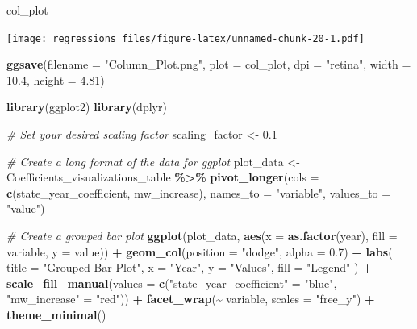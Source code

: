 \documentclass[
]{article}
\newenvironment{Shaded}{\begin{snugshade}}{\end{snugshade}}
\newcommand{\AttributeTok}[1]{\textcolor[rgb]{0.13,0.29,0.53}{#1}}
\newcommand{\CommentTok}[1]{\textcolor[rgb]{0.56,0.35,0.01}{\textit{#1}}}
\newcommand{\FloatTok}[1]{\textcolor[rgb]{0.00,0.00,0.81}{#1}}
\newcommand{\FunctionTok}[1]{\textcolor[rgb]{0.13,0.29,0.53}{\textbf{#1}}}
\newcommand{\NormalTok}[1]{#1}
\newcommand{\OtherTok}[1]{\textcolor[rgb]{0.56,0.35,0.01}{#1}}
\newcommand{\SpecialCharTok}[1]{\textcolor[rgb]{0.81,0.36,0.00}{\textbf{#1}}}
\newcommand{\StringTok}[1]{\textcolor[rgb]{0.31,0.60,0.02}{#1}}
\begin{document}
\begin{Shaded}
\begin{Highlighting}[]
\NormalTok{col\_plot}
\end{Highlighting}
\end{Shaded}

\texttt{[image: regressions\_files/figure-latex/unnamed-chunk-20-1.pdf]}

\begin{Shaded}
\begin{Highlighting}[]
\FunctionTok{ggsave}\NormalTok{(}\AttributeTok{filename =} \StringTok{"Column\_Plot.png"}\NormalTok{, }\AttributeTok{plot =}\NormalTok{ col\_plot, }\AttributeTok{dpi =} \StringTok{"retina"}\NormalTok{, }\AttributeTok{width =} \FloatTok{10.4}\NormalTok{, }\AttributeTok{height =} \FloatTok{4.81}\NormalTok{)}
\end{Highlighting}
\end{Shaded}

\begin{Shaded}
\begin{Highlighting}[]
\FunctionTok{library}\NormalTok{(ggplot2)}
\FunctionTok{library}\NormalTok{(dplyr)}

\CommentTok{\# Set your desired scaling factor}
\NormalTok{scaling\_factor }\OtherTok{\textless{}{-}} \FloatTok{0.1}

\CommentTok{\# Create a long format of the data for ggplot}
\NormalTok{plot\_data }\OtherTok{\textless{}{-}}\NormalTok{ Coefficients\_visualizations\_table }\SpecialCharTok{\%\textgreater{}\%}
  \FunctionTok{pivot\_longer}\NormalTok{(}\AttributeTok{cols =} \FunctionTok{c}\NormalTok{(state\_year\_coefficient, mw\_increase),}
               \AttributeTok{names\_to =} \StringTok{"variable"}\NormalTok{,}
               \AttributeTok{values\_to =} \StringTok{"value"}\NormalTok{)}

\CommentTok{\# Create a grouped bar plot}
\FunctionTok{ggplot}\NormalTok{(plot\_data, }\FunctionTok{aes}\NormalTok{(}\AttributeTok{x =} \FunctionTok{as.factor}\NormalTok{(year), }\AttributeTok{fill =}\NormalTok{ variable, }\AttributeTok{y =}\NormalTok{ value)) }\SpecialCharTok{+}
  \FunctionTok{geom\_col}\NormalTok{(}\AttributeTok{position =} \StringTok{"dodge"}\NormalTok{, }\AttributeTok{alpha =} \FloatTok{0.7}\NormalTok{) }\SpecialCharTok{+}
  \FunctionTok{labs}\NormalTok{(}
    \AttributeTok{title =} \StringTok{"Grouped Bar Plot"}\NormalTok{,}
    \AttributeTok{x =} \StringTok{"Year"}\NormalTok{,}
    \AttributeTok{y =} \StringTok{"Values"}\NormalTok{,}
    \AttributeTok{fill =} \StringTok{"Legend"}
\NormalTok{  ) }\SpecialCharTok{+}
  \FunctionTok{scale\_fill\_manual}\NormalTok{(}\AttributeTok{values =} \FunctionTok{c}\NormalTok{(}\StringTok{"state\_year\_coefficient"} \OtherTok{=} \StringTok{"blue"}\NormalTok{, }\StringTok{"mw\_increase"} \OtherTok{=} \StringTok{"red"}\NormalTok{)) }\SpecialCharTok{+}
  \FunctionTok{facet\_wrap}\NormalTok{(}\SpecialCharTok{\textasciitilde{}}\NormalTok{ variable, }\AttributeTok{scales =} \StringTok{"free\_y"}\NormalTok{) }\SpecialCharTok{+}
  \FunctionTok{theme\_minimal}\NormalTok{()}
\end{Highlighting}
\end{Shaded}
\end{document}
